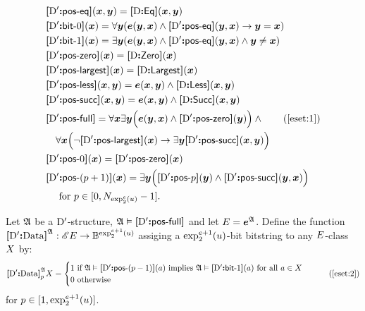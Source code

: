 \begin{align}
  &\fposeq\DSp(\xx,\yy) = \fEq\DS(\xx,\yy) \nonumber \\
  &\fbitO\DSp(\xx) = \forall\yy(\se(\yy,\xx) \land 
    \fposeq\DSp(\yy,\xx) \limp \yy = \xx) \nonumber \\
  &\fbitI\DSp(\xx) = \exists\yy(\se(\yy,\xx) \land
    \fposeq\DSp(\yy,\xx) \land \yy \neq \xx) \nonumber \\
  &\fposzero\DSp(\xx) = \fZero\DS(\xx) \nonumber \\
  &\fposmax\DSp(\xx) = \fMax\DS(\xx) \nonumber \\
  &\fposless\DSp(\xx,\yy) = \se(\xx,\yy) \land
    \fLess\DS(\xx,\yy) \nonumber \\
  &\fpossucc\DSp(\xx,\yy) = \se(\xx,\yy) \land
    \fSucc\DS(\xx,\yy) \nonumber \\
  &\fposfull\DSp = \forall\xx\exists\yy\Big(\se(\yy,\xx) \land 
    \fposzero\DSp(\yy)\Big) \land \tag{\ref{eset:1}}\\
    &\quad\forall\xx\Big(\lnot\fposmax\DSp(\xx) \limp
    \exists\yy\fpossucc\DSp(\xx,\yy)\Big) \nonumber \\
  &\fposA\DSp0(\xx) = \fposzero\DSp(\xx) \nonumber \\
  &\fposA\DSp{(\posp+1)}(\xx) = \exists\yy\Big(
    \fposA\DSp\posp(\yy) \land \fpossucc\DSp(\yy,\xx)
  \Big) \nonumber \\
    &\quad\text{ for } \posp \in [0,\largtbit{\tetr\sze2\szu}-1].\nonumber
\end{align}

Let $\StrA$ be a $\DSp$-structure, $\StrA \vDash \fposfull\DSp$ and let
$\relE=\at\StrA\se$.
Define the function $\Data\DSp\StrA : \Ecl\relE \to
\tBitstrings{\tetr{\sze+1}2\szu}$ assiging a $\tetr{\sze+1}2\szu$-bit
bitstring to any $\relE$-class $\eclX$ by:
\begin{equation}
  \Data\DSp\StrA_\posp\eclX = \begin{cases}
  1 \text{ if } \StrA \vDash \fposA\DSp{(\posp-1)}(\ea) 
  \text{ implies } \StrA \vDash \fbitI\DSp(\ea)
  \text{ for all } \ea \in \eclX
  \\
  0 \text{ otherwise}
  \end{cases}\tag{\ref{eset:2}}
\end{equation}
for $\posp \in [1,\tetr{\sze+1}2\szu]$.

